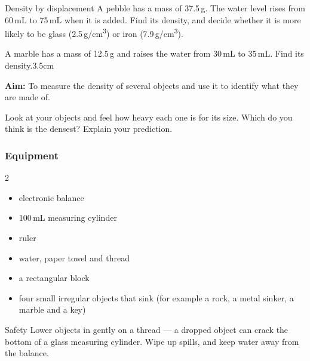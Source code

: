 \begin{wedo}{Density by displacement}
A pebble has a mass of 37.5\,g. The water level rises from 60\,mL to 75\,mL when it is added. Find its density, and decide whether it is more likely to be glass (2.5\,g/cm\textsuperscript{3}) or iron (7.9\,g/cm\textsuperscript{3}).
\workbox{3.5cm}
\end{wedo}

\begin{youdobox}
         {A marble has a mass of 12.5\,g and raises the water from 30\,mL to 35\,mL. Find its density.}{3.5cm}
\end{youdobox}


\textbf{Aim:} To measure the density of several objects and use it to identify what they are made of.

\task Look at your objects and feel how heavy each one is for its size. Which do you think is the densest? Explain your prediction. 
\answerbox{5cm}

\subsubsection*{Equipment}
\begin{multicols}{2}
\begin{itemize}[leftmargin=1.2em, itemsep=0pt, topsep=0pt]
  \item electronic balance
  \item 100\,mL measuring cylinder
  \item ruler
  \item water, paper towel and thread
  \item a rectangular block
  \item four small irregular objects that sink (for example a rock, a metal sinker, a marble and a key)
\end{itemize}
\end{multicols}

\begin{infobox}{Safety}
Lower objects in gently on a thread --- a dropped object can crack the bottom of a glass measuring cylinder. Wipe up spills, and keep water away from the balance.
\end{infobox}

